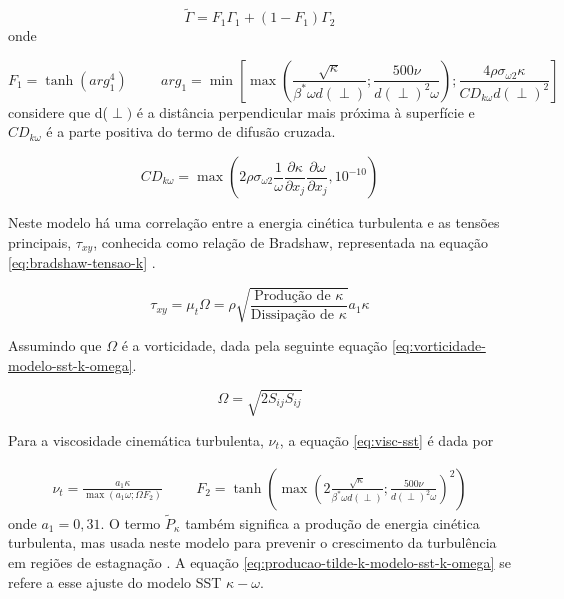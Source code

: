 \begin{equation}
	\label{eq:funcaomistura-modelo-sst-k-omega}
    \tilde{\Gamma} = F_1 \Gamma_1 + (1 - F_1) \Gamma_2
\end{equation}
%
onde 

\begin{equation}
		F_1 = \tanh{(arg_1^{4})}
		\hspace{1cm}
    	arg_1 = \min\left[\max\left(\frac{\sqrt{\kappa}}{\beta^{*}\omega d(\perp)};\frac{500\nu}{d(\perp)^2 \omega}\right);\frac{4\rho\sigma_{\omega 2}\kappa}{CD_{k\omega}d(\perp)^2}\right]
\end{equation}
%
considere que d(\(\perp)\) é a distância perpendicular mais próxima à superfície e \(CD_{k\omega}\) é a parte positiva do termo de difusão cruzada.

\begin{equation}
    CD_{k\omega} = \max\left(2\rho\sigma_{\omega 2}\frac{1}{\omega}\frac{\partial \kappa}{\partial x_j}\frac{\partial \omega}{\partial x_j}, 10^{-10} \right)
\end{equation}

Neste modelo há uma correlação entre a energia cinética turbulenta e as tensões principais, \(\tau_{xy}\), conhecida como relação de Bradshaw, representada na equação \ref{eq:bradshaw-tensao-k} \cite{Menter1994TwoequationET}.

\begin{equation}
	\label{eq:bradshaw-tensao-k}
	\tau_{xy} = \mu_{t}\Omega = \rho\sqrt{\frac{\text{Produção de }\kappa}{\text{Dissipação de }\kappa}}a_{1}\kappa
\end{equation}

Assumindo que \(\Omega\) é a vorticidade, dada pela seguinte equação \ref{eq:vorticidade-modelo-sst-k-omega}.

\begin{equation}
	\label{eq:vorticidade-modelo-sst-k-omega}
	\Omega = \sqrt{2 S_{ij}S_{ij}}
\end{equation}

Para a viscosidade cinemática turbulenta, \(\nu_t\), a equação \ref{eq:visc-sst} é dada por

\begin{equation}
\begin{split}
    \label{eq:visc-sst}
    \nu_t = \frac{a_1 \kappa}{\max(a_1 \omega;\Omega F_2)} \hspace{1cm}
    F_2 = \tanh{\left(\max\left(2\frac{\sqrt{\kappa}}{\beta^{*}\omega d(\perp)}; \frac{500\nu}{ d(\perp)^2\omega}\right)^{2}\right)} 
\end{split}
\end{equation}
%
onde \(a_1 = 0,31\). O termo \(\tilde{P}_{\kappa}\) também significa a produção de energia cinética turbulenta, mas usada neste modelo para prevenir o crescimento da turbulência em regiões de estagnação \cite{Menter2009}. A equação \ref{eq:producao-tilde-k-modelo-sst-k-omega} se refere a esse ajuste do modelo SST \(\kappa-\omega\).

